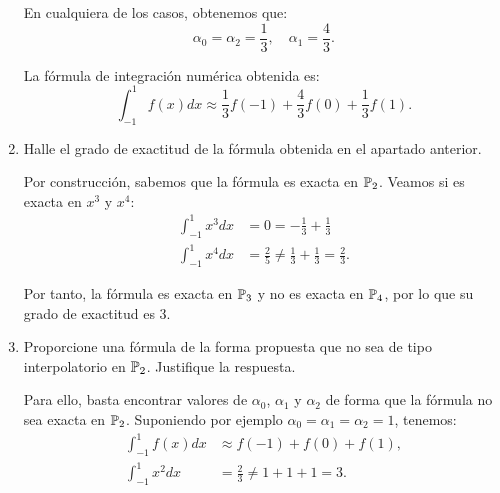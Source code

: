 \begin{ejercicio}
\begin{enumerate}
        En cualquiera de los casos, obtenemos que:
        \begin{equation*}
            \alpha_0 = \alpha_2 = \frac{1}{3},\quad \alpha_1 = \frac{4}{3}.
        \end{equation*}

        La fórmula de integración numérica obtenida es:
        \begin{equation*}
            \int_{-1}^{1} f(x) dx \approx \frac{1}{3} f(-1) + \frac{4}{3} f(0) + \frac{1}{3} f(1).
        \end{equation*}
        \item Halle el grado de exactitud de la fórmula obtenida en el apartado anterior.
        
        Por construcción, sabemos que la fórmula es exacta en $\mathbb{P}_2$. Veamos si es exacta en $x^3$ y $x^4$:
        \begin{align*}
            \int_{-1}^{1} x^3 dx &= 0= -\frac{1}{3}+\frac{1}{3}\\
            \int_{-1}^{1} x^4 dx &= \frac{2}{5} \neq \frac{1}{3} + \frac{1}{3} = \frac{2}{3}.
        \end{align*}

        Por tanto, la fórmula es exacta en $\mathbb{P}_3$ y no es exacta en $\mathbb{P}_4$, por lo que su grado de exactitud es 3.
        \item Proporcione una fórmula de la forma propuesta que no sea de tipo interpolatorio en $\mathbb{P}_2$. Justifique la respuesta.
        
        Para ello, basta encontrar valores de $\alpha_0$, $\alpha_1$ y $\alpha_2$ de forma que la fórmula no sea exacta en $\mathbb{P}_2$. Suponiendo por ejemplo $\alpha_0 = \alpha_1 = \alpha_2 = 1$, tenemos:
        \begin{align*}
            \int_{-1}^{1} f(x) dx &\approx f(-1) + f(0) + f(1),\\
            \int_{-1}^{1} x^2 dx &= \frac{2}{3} \neq 1 + 1 + 1 = 3.
        \end{align*}
    \end{enumerate}
\end{ejercicio}

